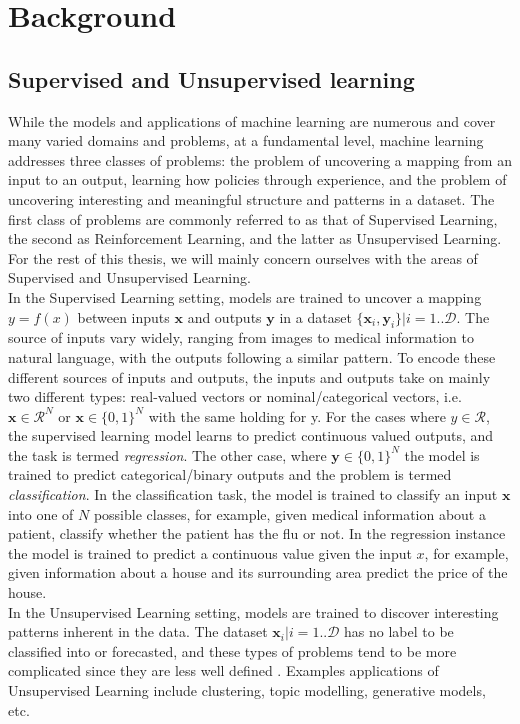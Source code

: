 \chapter{Background} \label{bg}
 \section{Supervised and Unsupervised learning}
 While the models and applications of machine learning are numerous and cover many varied domains and problems, at a fundamental level, machine learning addresses three classes of problems: the problem of uncovering a mapping from an input to an output, learning how policies through experience, and the problem of uncovering interesting and meaningful structure and patterns in a dataset. The first class of problems are commonly referred to as that of Supervised Learning, the second as Reinforcement Learning, and the latter as Unsupervised Learning. For the rest of this thesis, we will mainly concern ourselves with the areas of Supervised and Unsupervised Learning.\\

 In the Supervised Learning setting, models are trained to uncover a mapping $y=f(x)$ between inputs $\mathbf{x}$ and outputs $\mathbf{y}$ in a dataset $\{\mathbf{x}_i, \mathbf{y}_i\} | i=1.. \mathcal{D}$. The source of inputs vary widely, ranging from images to medical information to natural language, with the outputs following a similar pattern. To encode these different sources of inputs and outputs, the inputs and outputs take on mainly two different types: real-valued vectors or nominal/categorical vectors, i.e. $\mathbf{x} \in \mathcal{R}^N$ or $\mathbf{x} \in \{0,1\}^N$ with the same holding for y. For the cases where $y \in \mathcal{R}$, the supervised learning model learns to predict continuous valued outputs, and the task is termed \textit{regression}. The other case, where $\mathbf{y} \in \{0,1\}^N$ the model is trained to predict categorical/binary outputs and the problem is termed \textit{classification}. In the classification task, the model is trained to classify an input $\mathbf{x}$ into one of $N$ possible classes, for example, given medical information about a patient, classify whether the patient has the flu or not. In the regression instance the model is trained to predict a continuous value given the input $x$, for example, given information about a house and its surrounding area predict the price of the house.\\

 In the Unsupervised Learning setting, models are trained to discover interesting patterns inherent in the data. The dataset $\mathbf{x}_i | i=1..\mathcal{D}$ has no label to be classified into or forecasted, and these types of problems tend to be more complicated since they are less well defined \citep{murphy2012machine}. Examples applications of Unsupervised Learning include clustering, topic modelling, generative models, etc.

